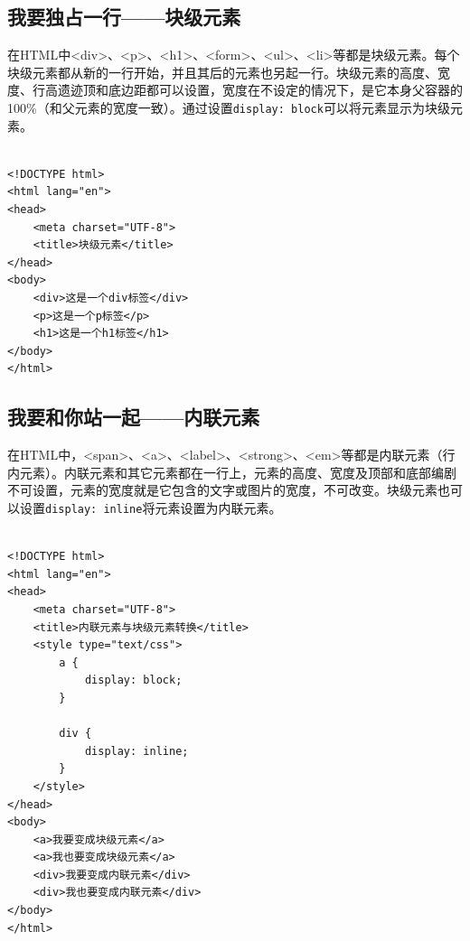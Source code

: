 \subsection{我要独占一行——块级元素}

在HTML中<div>、<p>、<h1>、<form>、<ul>、<li>等都是块级元素。每个块级元素都从新的一行开始，并且其后的元素也另起一行。块级元素的高度、宽度、行高遗迹顶和底边距都可以设置，宽度在不设定的情况下，是它本身父容器的100\%（和父元素的宽度一致）。通过设置\lstinline|display: block|可以将元素显示为块级元素。\\

\\

\begin{lstlisting}[style=htmlcssjs]
<!DOCTYPE html>
<html lang="en">
<head>
    <meta charset="UTF-8">
    <title>块级元素</title>
</head>
<body>
    <div>这是一个div标签</div>
    <p>这是一个p标签</p>
    <h1>这是一个h1标签</h1>
</body>
</html>
\end{lstlisting}

\vspace{0.5cm}

\subsection{我要和你站一起——内联元素}

在HTML中，<span>、<a>、<label>、<strong>、<em>等都是内联元素（行内元素）。内联元素和其它元素都在一行上，元素的高度、宽度及顶部和底部编剧不可设置，元素的宽度就是它包含的文字或图片的宽度，不可改变。块级元素也可以设置\lstinline|display: inline|将元素设置为内联元素。\\

\\

\begin{lstlisting}[style=htmlcssjs]
<!DOCTYPE html>
<html lang="en">
<head>
    <meta charset="UTF-8">
    <title>内联元素与块级元素转换</title>
    <style type="text/css">
        a {
            display: block;
        }

        div {
            display: inline;
        }
    </style>
</head>
<body>
    <a>我要变成块级元素</a>
    <a>我也要变成块级元素</a>
    <div>我要变成内联元素</div>
    <div>我也要变成内联元素</div>
</body>
</html>
\end{lstlisting}

\vspace{0.5cm}

